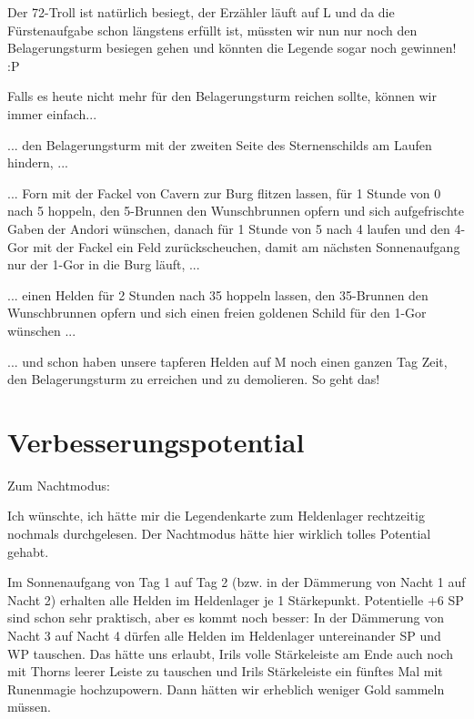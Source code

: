 \documentclass[10pt, a4paper, oneside]{book}
\begin{document}
{Der 72-Troll ist natürlich besiegt, der Erzähler läuft auf L und da die Fürstenaufgabe schon längstens erfüllt ist, müssten wir nun nur noch den Belagerungsturm besiegen gehen und könnten die Legende sogar noch gewinnen! :P\bigskip



Falls es heute nicht mehr für den Belagerungsturm reichen sollte, können wir immer einfach...

... den Belagerungsturm mit der zweiten Seite des Sternenschilds am Laufen hindern, ...

... Forn mit der Fackel von Cavern zur Burg flitzen lassen, für 1 Stunde von 0 nach 5 hoppeln, den 5-Brunnen den Wunschbrunnen opfern und sich aufgefrischte Gaben der Andori wünschen, danach für 1 Stunde von 5 nach 4 laufen und den 4-Gor mit der Fackel ein Feld zurückscheuchen, damit am nächsten Sonnenaufgang nur der 1-Gor in die Burg läuft, ...

... einen Helden für 2 Stunden nach 35 hoppeln lassen, den 35-Brunnen den Wunschbrunnen opfern und sich einen freien goldenen Schild für den 1-Gor wünschen ...

... und schon haben unsere tapferen Helden auf M noch einen ganzen Tag Zeit, den Belagerungsturm zu erreichen und zu demolieren. So geht das!






\newpage
\section{Verbesserungspotential}







Zum Nachtmodus:



Ich wünschte, ich hätte mir die Legendenkarte zum Heldenlager rechtzeitig nochmals durchgelesen. Der Nachtmodus hätte hier wirklich tolles Potential gehabt.

Im Sonnenaufgang von Tag 1 auf Tag 2 (bzw. in der Dämmerung von Nacht 1 auf Nacht 2) erhalten alle Helden im Heldenlager je 1 Stärkepunkt. Potentielle +6 SP sind schon sehr praktisch, aber es kommt noch besser: In der Dämmerung von Nacht 3 auf Nacht 4 dürfen alle Helden im Heldenlager untereinander SP und WP tauschen. Das hätte uns erlaubt, Irils volle Stärkeleiste am Ende auch noch mit Thorns leerer Leiste zu tauschen und Irils Stärkeleiste ein fünftes Mal mit Runenmagie hochzupowern. Dann hätten wir erheblich weniger Gold sammeln müssen.

}
\end{document}
